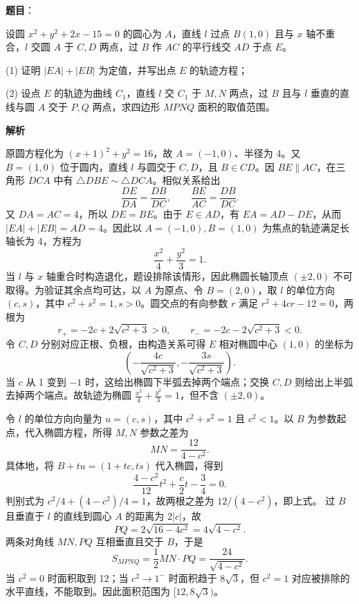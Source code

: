 \begin{answer}

\textbf{题目}：

设圆 $x^2+y^2+2x-15=0$ 的圆心为 $A$，直线 $l$ 过点 $B(1,0)$ 且与 $x$ 轴不重合，$l$ 交圆 $A$ 于 $C,D$ 两点，过 $B$ 作 $AC$ 的平行线交 $AD$ 于点 $E$。

   (1) 证明 $|EA|+|EB|$ 为定值，并写出点 $E$ 的轨迹方程；

   (2) 设点 $E$ 的轨迹为曲线 $C_1$，直线 $l$ 交 $C_1$ 于 $M,N$ 两点，过 $B$ 且与 $l$ 垂直的直线与圆 $A$ 交于 $P,Q$ 两点，求四边形 $MPNQ$ 面积的取值范围。

\textbf{解析}


原圆方程化为 \((x+1)^2+y^2=16\)，故 \(A=(-1,0)\)、半径为 4。又 \(B=(1,0)\) 位于圆内，直线 \(l\) 与圆交于 \(C,D\)，且 \(B\in CD\)。因 \(BE\parallel AC\)，在三角形 \(DCA\) 中有 \(\triangle DBE\sim\triangle DCA\)。相似关系给出
\nopagebreak[4]
\[
\frac{DE}{DA}=\frac{DB}{DC},\qquad \frac{BE}{AC}=\frac{DB}{DC}.
\]
又 \(DA=AC=4\)，所以 \(DE=BE\)。由于 \(E\in AD\)，有 \(EA=AD-DE\)，从而 \(|EA|+|EB|=AD=4\)。因此以 \(A=(-1,0),B=(1,0)\) 为焦点的轨迹满足长轴长为 4，方程为
\nopagebreak[4]
\[
\frac{x^2}{4}+\frac{y^2}{3}=1.
\]
当 \(l\) 与 \(x\) 轴重合时构造退化，题设排除该情形，因此椭圆长轴顶点 \((\pm2,0)\) 不可取得。为验证其余点均可达，以 \(A\) 为原点、令 \(B=(2,0)\)，取 \(l\) 的单位方向 \((c,s)\)，其中 \(c^2+s^2=1,s>0\)。圆交点的有向参数 \(r\) 满足 \(r^2+4cr-12=0\)，两根为
\nopagebreak[4]
\[
r_+=-2c+2\sqrt{c^2+3}>0,\qquad r_-=-2c-2\sqrt{c^2+3}<0.
\]
令 \(C,D\) 分别对应正根、负根，由构造关系可得 \(E\) 相对椭圆中心 \((1,0)\) 的坐标为
\nopagebreak[4]
\[
\left(-\frac{4c}{\sqrt{c^2+3}},-\frac{3s}{\sqrt{c^2+3}}\right).
\]
当 \(c\) 从 1 变到 \(-1\) 时，这给出椭圆下半弧去掉两个端点；交换 \(C,D\) 则给出上半弧去掉两个端点。故轨迹为椭圆 \(\frac{x^2}{4}+\frac{y^2}{3}=1\)，但不含 \((\pm2,0)\)。


令 \(l\) 的单位方向向量为 \(u=(c,s)\)，其中 \(c^2+s^2=1\) 且 \(c^2<1\)。以 \(B\) 为参数起点，代入椭圆方程，所得 \(M,N\) 参数之差为
\nopagebreak[4]
\[
MN=\frac{12}{4-c^2}.
\]
具体地，将 \(B+tu=(1+tc,ts)\) 代入椭圆，得到
\nopagebreak[4]
\[
\frac{4-c^2}{12}t^2+\frac c2t-\frac34=0.
\]
判别式为 \(c^2/4+(4-c^2)/4=1\)，故两根之差为 \(12/(4-c^2)\)，即上式。
过 \(B\) 且垂直于 \(l\) 的直线到圆心 \(A\) 的距离为 \(2|c|\)，故
\nopagebreak[4]
\[
PQ=2\sqrt{16-4c^2}=4\sqrt{4-c^2}.
\]
两条对角线 \(MN,PQ\) 互相垂直且交于 \(B\)，于是
\nopagebreak[4]
\[
S_{MPNQ}=\frac12MN\cdot PQ=\frac{24}{\sqrt{4-c^2}}.
\]
当 \(c^2=0\) 时面积取到 12；当 \(c^2\to1^-\) 时面积趋于 \(8\sqrt3\)，但 \(c^2=1\) 对应被排除的水平直线，不能取到。因此面积范围为 \([12,8\sqrt3)\)。


\gkanswer{答案（2）：面积范围 \([12,8\sqrt3)\)}

\end{answer}
